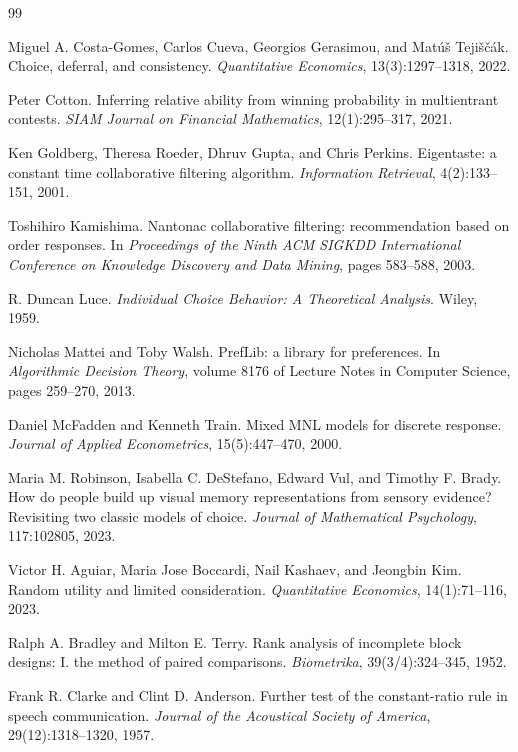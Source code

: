 \documentclass[11pt]{article}
\begin{document}
\begin{thebibliography}{99}

Miguel A. Costa-Gomes, Carlos Cueva, Georgios Gerasimou, and Mat\'u\v{s}
Teji\v{s}\v{c}\'ak.
Choice, deferral, and consistency.
\emph{Quantitative Economics}, 13(3):1297--1318, 2022.

Peter Cotton.
Inferring relative ability from winning probability in multientrant contests.
\emph{SIAM Journal on Financial Mathematics}, 12(1):295--317, 2021.

Ken Goldberg, Theresa Roeder, Dhruv Gupta, and Chris Perkins.
Eigentaste: a constant time collaborative filtering algorithm.
\emph{Information Retrieval}, 4(2):133--151, 2001.

Toshihiro Kamishima.
Nantonac collaborative filtering: recommendation based on order responses.
In \emph{Proceedings of the Ninth ACM SIGKDD International Conference on Knowledge
Discovery and Data Mining}, pages 583--588, 2003.

R. Duncan Luce.
\emph{Individual Choice Behavior: A Theoretical Analysis}.
Wiley, 1959.

Nicholas Mattei and Toby Walsh.
PrefLib: a library for preferences.
In \emph{Algorithmic Decision Theory}, volume 8176 of Lecture Notes in Computer Science,
pages 259--270, 2013.

Daniel McFadden and Kenneth Train.
Mixed MNL models for discrete response.
\emph{Journal of Applied Econometrics}, 15(5):447--470, 2000.

Maria M. Robinson, Isabella C. DeStefano, Edward Vul, and Timothy F. Brady.
How do people build up visual memory representations from sensory evidence?
Revisiting two classic models of choice.
\emph{Journal of Mathematical Psychology}, 117:102805, 2023.

Victor H. Aguiar, Maria Jose Boccardi, Nail Kashaev, and Jeongbin Kim.
Random utility and limited consideration.
\emph{Quantitative Economics}, 14(1):71--116, 2023.

Ralph A. Bradley and Milton E. Terry.
Rank analysis of incomplete block designs: I. the method of paired comparisons.
\emph{Biometrika}, 39(3/4):324--345, 1952.

Frank R. Clarke and Clint D. Anderson.
Further test of the constant-ratio rule in speech communication.
\emph{Journal of the Acoustical Society of America}, 29(12):1318--1320, 1957.


\end{thebibliography}
\end{document}
